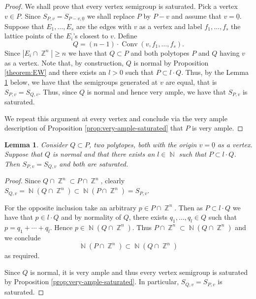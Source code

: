 \documentclass[a4paper,11pt]{amsart}
\theoremstyle{plain}
\newtheorem{lemma}[theorem]{Lemma}
\theoremstyle{definition}
\theoremstyle{remark}
\DeclareMathOperator{\NN}{\mathbb{N}}
\DeclareMathOperator{\ZZ}{\mathbb{Z}}
\DeclareMathOperator{\Conv}{Conv}
\begin{document}
\begin{proof}
We shall prove that every vertex semigroup is saturated.
Pick a vertex $v \in P$.
Since $S_{P,v}=S_{P-v,\underline{0}}$ we shall replace $P$ by $P-v$ and assume that $v=\underline{0}$.
Suppose that $E_1, \dots , E_s$ are the edges with $v$ as a vertex and label $f_1, \dots , f_s$ the lattice points of the $E_i$'s closest to $v$.
Define 
\[Q = (n-1) \cdot \Conv(v,f_1, \dots , f_s).\]
Since $|E_i \cap \ZZ^n| \geq n$ we have that $Q\subset P$ and both polytopes $P$ and $Q$ having $v$ as a vertex.
Note that, by construction, $Q$ is normal by Proposition \ref{theorem:EW} and there exists an $l>0$ such that $P \subset l \cdot Q$.
Thus, by the Lemma \ref{lemma:vertex-semigroups} below, we have that the semigroups generated at $v$ are equal, that is $S_{P,v} = S_{Q,v}$.
Thus, since $Q$ is normal and hence very ample, we have that $S_{P,v}$ is saturated.

We repeat this argument at every vertex and conclude via the very ample description of Proposition \ref{prop:very-ample-saturated} that $P$ is very ample.
\end{proof}

\begin{lemma}\label{lemma:vertex-semigroups}
Consider $Q \subset P$, two polytopes, both with the origin $v=\underline{0}$ as a vertex.
Suppose that $Q$ is normal and that there exists an $l\in \NN$ such that $P \subset l \cdot Q$.
Then $S_{P,v} = S_{Q,v}$ and both are saturated.
\end{lemma}

\begin{proof}
Since $Q\cap \ZZ^n \subset P\cap \ZZ^n$, clearly $S_{Q,v} = \NN(Q\cap \ZZ^n) \subset \NN(P \cap \ZZ^n) = S_{P,v}$.

For the opposite inclusion take an arbitrary $p \in P \cap \ZZ^n$.
Then as $P \subset l \cdot Q$ we have that $p \in l \cdot Q$ and by normality of $Q$, there exists $q_1, \dots , q_l \in Q$ such that $p = q_1 + \cdots + q_l$.
Hence $p \in \NN(Q \cap \ZZ^n)$.
Thus $P \cap \ZZ^n \subset \NN(Q \cap \ZZ^n)$ and we conclude
\[\NN(P \cap \ZZ^n) \subset \NN(Q \cap \ZZ^n)\]
as required.

Since $Q$ is normal, it is very ample and thus every vertex semigroup is saturated by Proposition \ref{prop:very-ample-saturated}.
In particular, $S_{Q,v} = S_{P,v}$ is saturated.
\end{proof}
\end{document}

